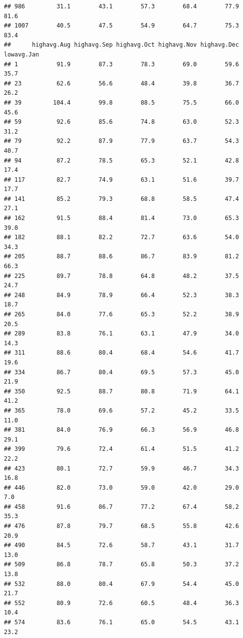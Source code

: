 \documentclass[
]{article}
\begin{document}
\begin{verbatim}
## 986         31.1        43.1        57.3        68.4        77.9        81.6
## 1007        40.5        47.5        54.9        64.7        75.3        83.4
##      highavg.Aug highavg.Sep highavg.Oct highavg.Nov highavg.Dec lowavg.Jan
## 1           91.9        87.3        78.3        69.0        59.6       35.7
## 23          62.6        56.6        48.4        39.8        36.7       26.2
## 39         104.4        99.8        88.5        75.5        66.0       45.6
## 59          92.6        85.6        74.8        63.0        52.3       31.2
## 79          92.2        87.9        77.9        63.7        54.3       40.7
## 94          87.2        78.5        65.3        52.1        42.8       17.4
## 117         82.7        74.9        63.1        51.6        39.7       17.7
## 141         85.2        79.3        68.8        58.5        47.4       27.1
## 162         91.5        88.4        81.4        73.0        65.3       39.0
## 182         88.1        82.2        72.7        63.6        54.0       34.3
## 205         88.7        88.6        86.7        83.9        81.2       66.3
## 225         89.7        78.8        64.8        48.2        37.5       24.7
## 248         84.9        78.9        66.4        52.3        38.3       18.7
## 265         84.0        77.6        65.3        52.2        38.9       20.5
## 289         83.8        76.1        63.1        47.9        34.0       14.3
## 311         88.6        80.4        68.4        54.6        41.7       19.6
## 334         86.7        80.4        69.5        57.3        45.0       21.9
## 350         92.5        88.7        80.8        71.9        64.1       41.2
## 365         78.0        69.6        57.2        45.2        33.5       11.0
## 381         84.0        76.9        66.3        56.9        46.8       29.1
## 399         79.6        72.4        61.4        51.5        41.2       22.2
## 423         80.1        72.7        59.9        46.7        34.3       16.8
## 446         82.0        73.0        59.0        42.0        29.0        7.0
## 458         91.6        86.7        77.2        67.4        58.2       35.3
## 476         87.8        79.7        68.5        55.8        42.6       20.9
## 490         84.5        72.6        58.7        43.1        31.7       13.0
## 509         86.8        78.7        65.8        50.3        37.2       13.8
## 532         88.0        80.4        67.9        54.4        45.0       21.7
## 552         80.9        72.6        60.5        48.4        36.3       10.4
## 574         83.6        76.1        65.0        54.5        43.1       23.2

\end{verbatim}
\end{document}
